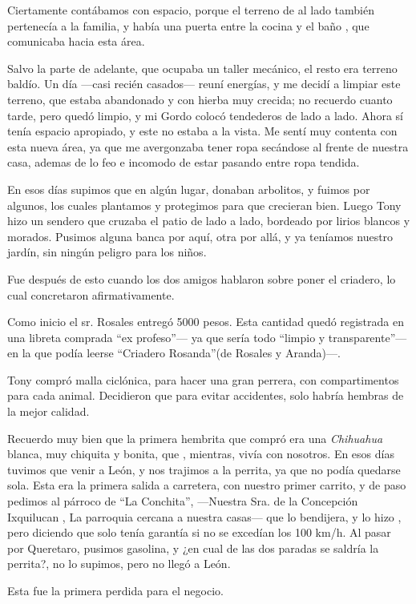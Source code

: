 \documentclass[letterpaper, 12pt]{book}
\begin{document}
Ciertamente contábamos con espacio, porque el terreno de al lado también pertenecía a la familia, y había una puerta entre la cocina y el baño , que comunicaba hacia esta área.

Salvo la parte de adelante, que ocupaba un taller mecánico, el resto era terreno baldío. Un día ---casi recién casados--- reuní energías, y me decidí a limpiar este terreno, que estaba abandonado y con hierba muy crecida; no recuerdo cuanto tarde, pero quedó limpio, y mi Gordo colocó tendederos de lado a lado. Ahora sí tenía espacio apropiado, y este no estaba a la vista. Me sentí muy contenta con esta nueva área, ya que me avergonzaba tener ropa secándose al frente de nuestra casa, ademas de lo feo e incomodo de estar pasando entre ropa tendida.

En esos días supimos que en algún lugar, donaban arbolitos, y fuimos por algunos, los cuales plantamos y protegimos para que crecieran bien. Luego Tony hizo un sendero que cruzaba el patio de lado a lado, bordeado por lirios blancos y morados. Pusimos alguna banca por aquí, otra por allá, y ya teníamos nuestro jardín, sin ningún peligro para los niños.

Fue después de esto cuando los dos amigos hablaron sobre poner el criadero, lo cual concretaron afirmativamente.

Como inicio el sr. Rosales entregó 5000 pesos. Esta cantidad quedó registrada en una libreta comprada ``ex profeso''--- ya que sería todo ``limpio y transparente''--- en la que podía leerse ``Criadero Rosanda''(de Rosales y Aranda)---.

Tony compró malla ciclónica, para hacer una gran perrera, con compartimentos para cada animal. Decidieron que para evitar accidentes, solo habría hembras de la mejor calidad.

Recuerdo muy bien que la primera hembrita que compró era una {\it Chihuahua} blanca, muy chiquita y bonita, que , mientras, vivía con nosotros. En esos días tuvimos que venir a León, y nos trajimos a la perrita, ya que no podía quedarse sola. Esta era la primera salida a carretera, con nuestro primer carrito, y de paso pedimos al párroco de ``La Conchita'', ---Nuestra Sra. de la Concepción Ixquilucan , La parroquia cercana a nuestra casas--- que lo bendijera, y lo hizo , pero diciendo que solo tenía garantía si no se excedían los 100 km/h. Al pasar por Queretaro, pusimos gasolina, y ¿en cual de las dos paradas se saldría la perrita?, no lo supimos, pero no llegó a León. 

Esta fue la primera perdida para el negocio.
\end{document}
